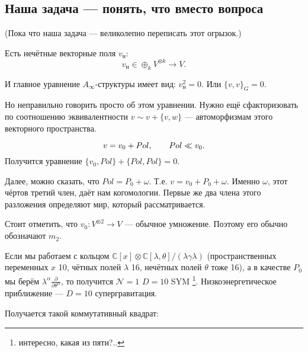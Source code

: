 \documentclass[11pt]{article}
\theoremstyle{remark}
\theoremstyle{definition}
\newcommand{\que}[1]{\footnote{\textcolor[rgb]{0.38,0.69,0.82}{#1}}}
\begin{document}
\subsection{Наша задача --- понять, что вместо вопроса}

(Пока что наша задача --- великолепно переписать этот огрызок.)

Есть нечётные векторные поля $v_{\text{н}}$: $$v_{\text{н}} \in \oplus_k V^{\otimes k} \to V.$$

И главное уравнение $A_{\infty}$-структуры имеет вид: $v_{\text{н}}^2 = 0.$ Или $\{v,v\}_G = 0.$

Но неправильно говорить просто об этом уравнении. Нужно ещё сфакторизовать по соотношению эквивалентности $v\sim v + \{v,w\}$ --- автоморфизмам этого векторного пространства.

$$v = v_0 + Pol, \hskip 20 pt Pol \ll v_0.$$ Получится уравнение $\{ v_0, Pol \} + \{ Pol, Pol \} = 0.$

Далее, можно сказать, что $Pol = P_0 + \omega$. Т.е. $v = v_0 + P_0 + \omega$. Именно $\omega$, этот чёртов третий член, даёт нам когомологии. Первые же два члена этого разложения определяют мир, который рассматривается.

Стоит отметить, что $v_0: V^{\otimes 2} \to V$ --- обычное умножение. Поэтому его обычно обозначают $m_2$.

Если мы работаем с кольцом $\mathbb{C}[x] \otimes \mathbb{C}[\lambda, \theta] / (\lambda \gamma \lambda)$ (пространственных переменных $x$ 10, чётных полей $\lambda$ 16, нечётных полей $\theta$ тоже 16), а в качестве $P_0$ мы берём $\lambda^{\alpha} \frac{\partial}{\partial \theta^{\alpha}}$, то получится $\mathcal{N} = 1$ $D=10$ SYM \que{интересно, какая из пяти?..}. Низкоэнергетическое приближение --- $D=10$ супергравитация.

Получается такой коммутативный квадрат:

\end{document}
